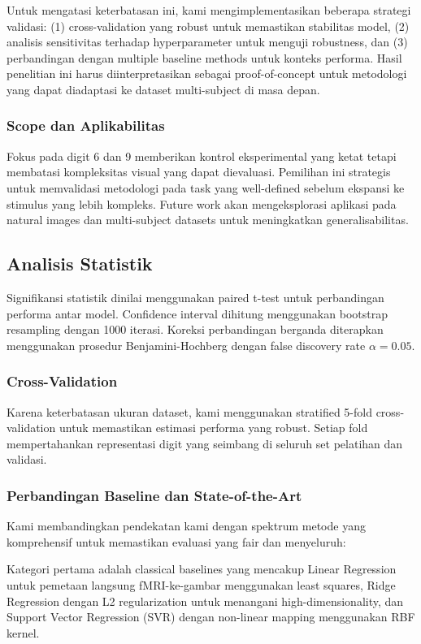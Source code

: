 Untuk mengatasi keterbatasan ini, kami mengimplementasikan beberapa strategi validasi: (1) cross-validation yang robust untuk memastikan stabilitas model, (2) analisis sensitivitas terhadap hyperparameter untuk menguji robustness, dan (3) perbandingan dengan multiple baseline methods untuk konteks performa. Hasil penelitian ini harus diinterpretasikan sebagai proof-of-concept untuk metodologi yang dapat diadaptasi ke dataset multi-subject di masa depan.

\subsubsection{Scope dan Aplikabilitas}
Fokus pada digit 6 dan 9 memberikan kontrol eksperimental yang ketat tetapi membatasi kompleksitas visual yang dapat dievaluasi. Pemilihan ini strategis untuk memvalidasi metodologi pada task yang well-defined sebelum ekspansi ke stimulus yang lebih kompleks. Future work akan mengeksplorasi aplikasi pada natural images dan multi-subject datasets untuk meningkatkan generalisabilitas.

\subsection{Analisis Statistik}

Signifikansi statistik dinilai menggunakan paired t-test untuk perbandingan performa antar model. Confidence interval dihitung menggunakan bootstrap resampling dengan 1000 iterasi. Koreksi perbandingan berganda diterapkan menggunakan prosedur Benjamini-Hochberg dengan false discovery rate $\alpha = 0.05$.

\subsubsection{Cross-Validation}
Karena keterbatasan ukuran dataset, kami menggunakan stratified 5-fold cross-validation untuk memastikan estimasi performa yang robust. Setiap fold mempertahankan representasi digit yang seimbang di seluruh set pelatihan dan validasi.

\subsubsection{Perbandingan Baseline dan State-of-the-Art}
Kami membandingkan pendekatan kami dengan spektrum metode yang komprehensif untuk memastikan evaluasi yang fair dan menyeluruh:

Kategori pertama adalah classical baselines yang mencakup Linear Regression untuk pemetaan langsung fMRI-ke-gambar menggunakan least squares, Ridge Regression dengan L2 regularization untuk menangani high-dimensionality, dan Support Vector Regression (SVR) dengan non-linear mapping menggunakan RBF kernel.

